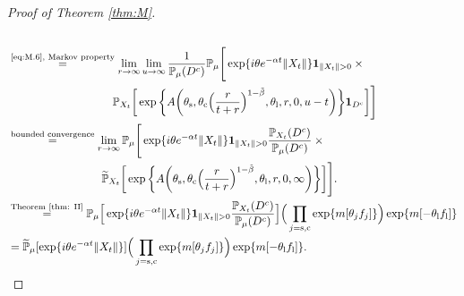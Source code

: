 \documentclass[12pt,a4paper]{amsart}
\theoremstyle{plain}
\theoremstyle{definition}
\numberwithin{equation}{section}
\begin{document}
\begin{proof}[Proof of Theorem \ref{thm:M}]
\begin{align}
\\&\begin{multlined}
\overset{\text{\eqref{eq:M.6}, Markov property}}=\lim_{r\to \infty}\lim_{u\rightarrow\infty}\frac{1}{\mathbb P_{\mu}(D^c)} \mathbb P_{\mu}\Bigg[\exp\{ i\theta e^{-\alpha t}\|X_t\|\}\mathbf 1_{\|X_t\|>0} \times {}
\\ \mathbb P_{X_t}\bigg[\exp\bigg\{A\bigg(\theta_\mathrm s,\theta_\mathrm c\Big(\frac{r}{t+r}\Big)^{1-\tilde \beta},\theta_\mathrm l,r,0,u-t\bigg)\bigg\}\mathbf 1_{D^c}\bigg]\Bigg]
\end{multlined}
\\&\begin{multlined}\overset{\text{bounded convergence}}=\lim_{r\to \infty} \mathbb P_{\mu}\Bigg[\exp\{ i\theta e^{-\alpha t}\|X_t\|\} \mathbf 1_{\|X_t\|>0}\frac{\mathbb P_{X_t}(D^c)}{\mathbb P_{\mu}(D^c)} \times {}
\\\widetilde{\mathbb P}_{X_t}\bigg[\exp\bigg\{A\bigg(\theta_\mathrm s,\theta_\mathrm c\Big(\frac{r}{t+r}\Big)^{1-\tilde \beta},\theta_\mathrm l,r,0,\infty\bigg)\bigg\}\bigg]\Bigg].
\end{multlined}
\\& \overset{\text{Theorem \ref{thm: II}}}=  \mathbb P_{\mu}\Big[\exp\{ i\theta e^{-\alpha t}\|X_t\|\} \mathbf 1_{\|X_t\|>0}\frac{\mathbb P_{X_t}(D^c)}{\mathbb P_{\mu}(D^c)} \Big]\Big(\prod_{j=\mathrm s,\mathrm c}\exp\{m[\theta_j f_j]\}\Big)\exp\{m[-\theta_\mathrm l f_\mathrm l]\}
\\&=\widetilde{\mathbb P}_{\mu}[\exp\{i\theta e^{-\alpha t}\|X_t\|\}]
\Big(\prod_{j=\mathrm s,\mathrm c}\exp\{m[\theta_j f_j]\}\Big)\exp\{m[-\theta_\mathrm l f_\mathrm l]\}.
\qedhere
\end{align}
\end{proof}
\end{document}

